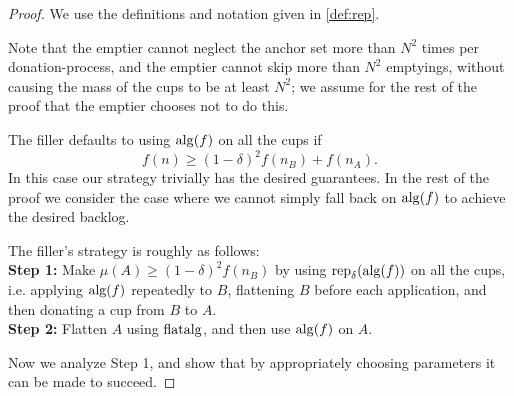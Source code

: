 \begin{proof}
  We use the definitions and notation given in \cref{def:rep}. 

  Note that the emptier cannot neglect the anchor set more than
  $N^2$ times per donation-process, and the emptier cannot skip
  more than $N^2$ emptyings, without causing the mass of the cups
  to be at least $N^2$; we assume for the rest of the proof that
  the emptier chooses not to do this.

  The filler defaults to using $\operatorname{\text{\textup{alg}}}(f)$ on all the cups if 
  $$f(n) \ge (1-\delta)^2 f(n_B) + f(n_A).$$
  In this case our strategy trivially has the desired guarantees. 
  In the rest of the proof we consider the case where we cannot
  simply fall back on $\operatorname{\text{\textup{alg}}}(f)$ to achieve the desired backlog.

  The filler's strategy is roughly as follows:\\
  \textbf{Step 1:} Make $\mu(A) \ge (1-\delta)^2 f(n_B)$ by
  using $\operatorname{\text{\textup{rep}}}_\delta(\operatorname{\text{\textup{alg}}}(f))$ on all the cups,
  i.e. applying $\operatorname{\text{\textup{alg}}}(f)$ repeatedly to $B$, flattening $B$ before
  each application, and then donating a cup from $B$ to $A$.\\
  \textbf{Step 2:} Flatten $A$ using $\operatorname{\text{\textup{flatalg}}}$, and then use
  $\operatorname{\text{\textup{alg}}}(f)$ on $A$.

  Now we analyze Step 1, and show that by appropriately choosing
  parameters it can be made to succeed.


\end{proof}
